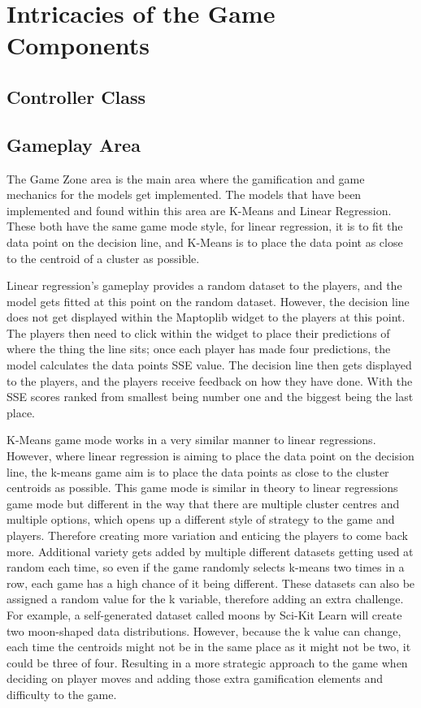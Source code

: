 	
	\section{Intricacies of the Game Components}
	\label{sec:gaem_intricacies}
	
	\subsection{Controller Class}
	
	
	
	\subsection{Gameplay Area}
		
		The Game Zone area is the main area where the gamification and game mechanics for the models get implemented.  The models that have been implemented and found within this area are K-Means and Linear Regression. These both have the same game mode style, for linear regression, it is to fit the data point on the decision line, and K-Means is to place the data point as close to the centroid of a cluster as possible. 
		
		Linear regression's gameplay provides a random dataset to the players, and the model gets fitted at this point on the random dataset. However, the decision line does not get displayed within the Maptoplib widget to the players at this point. The players then need to click within the widget to place their predictions of where the thing the line sits; once each player has made four predictions, the model calculates the data points SSE value. The decision line then gets displayed to the players, and the players receive feedback on how they have done. With the SSE scores ranked from smallest being number one and the biggest being the last place.
		
		K-Means game mode works in a very similar manner to linear regressions. However, where linear regression is aiming to place the data point on the decision line, the k-means game aim is to place the data points as close to the cluster centroids as possible. This game mode is similar in theory to linear regressions game mode but different in the way that there are multiple cluster centres and multiple options, which opens up a different style of strategy to the game and players. Therefore creating more variation and enticing the players to come back more. Additional variety gets added by multiple different datasets getting used at random each time, so even if the game randomly selects k-means two times in a row, each game has a high chance of it being different. These datasets can also be assigned a random value for the k variable, therefore adding an extra challenge. For example, a self-generated dataset called moons by Sci-Kit Learn will create two moon-shaped data distributions. However, because the k value can change, each time the centroids might not be in the same place as it might not be two, it could be three of four. Resulting in a more strategic approach to the game when deciding on player moves and adding those extra gamification elements and difficulty to the game.
		
